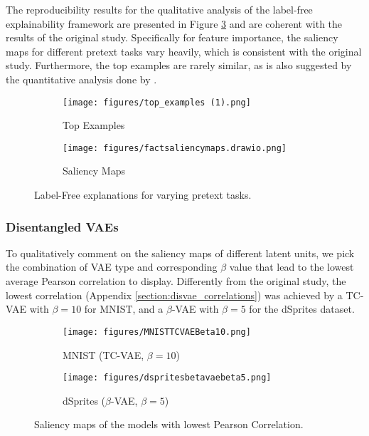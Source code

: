 The reproducibility results for the qualitative analysis of the label-free explainability framework are presented in Figure \ref{fig:examplesplussaliency} and are coherent with the results of the original study. Specifically for feature importance, the saliency maps for different pretext tasks vary heavily, which is consistent with the original study. Furthermore, the top examples are rarely similar, as is also suggested by the quantitative analysis done by \citeauthor{LabelFreeExplainability}.

\begin{figure}[H]
\centering
\begin{subfigure}{0.535\textwidth}
    \texttt{[image: figures/top\_examples (1).png]}
    \caption{Top Examples}
    \label{fig:topexamples}
\end{subfigure}
\hfill
\begin{subfigure}{0.455\textwidth}
    \texttt{[image: figures/factsaliencymaps.drawio.png]}
    \caption{Saliency Maps}
    \label{fig:saliencymaps}
\end{subfigure}
\caption{Label-Free explanations for varying pretext tasks.}
\label{fig:examplesplussaliency}
\end{figure}

\subsubsection{Disentangled VAEs} 
To qualitatively comment on the saliency maps of different latent units, we pick the combination of VAE type and corresponding $\beta$ value that lead to the lowest average Pearson correlation to display. Differently from the original study, the lowest correlation (Appendix \ref{section:disvae_correlations}) was achieved by a TC-VAE with $\beta=10$ for MNIST, and a $\beta$-VAE with $\beta=5$ for the dSprites dataset.

\begin{figure}[H]
\centering
\begin{subfigure}{0.37\textwidth}
    \texttt{[image: figures/MNISTTCVAEBeta10.png]}
    \caption{MNIST (TC-VAE, $\beta = 10$)}
    \label{fig:mnisttcvaebeta10}
\end{subfigure}
\hfill
\begin{subfigure}{0.615\textwidth}
    \texttt{[image: figures/dspritesbetavaebeta5.png]}
    \caption{dSprites ($\beta$-VAE, $\beta = 5$)}
    \label{fig:dspritesbetavaebeta5}
\end{subfigure}
\caption{Saliency maps of the models with lowest Pearson Correlation.}
\label{fig:saliencymapsvae}
\end{figure}

